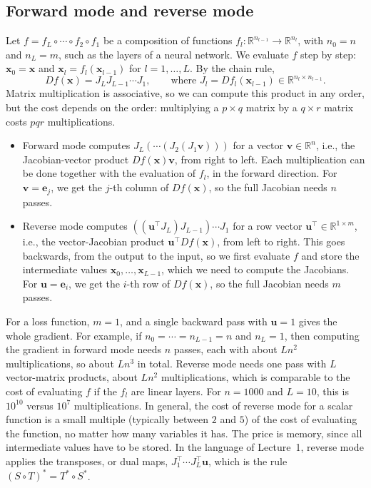 \subsection{Forward mode and reverse mode}

Let $f = f_L \circ \cdots \circ f_2 \circ f_1$ be a composition of functions $f_l: \mathbb{R}^{n_{l-1}} \to \mathbb{R}^{n_l}$, with $n_0 = n$ and $n_L = m$, such as the layers of a neural network. We evaluate $f$ step by step: $\mathbf{x}_0 = \mathbf{x}$ and $\mathbf{x}_l = f_l(\mathbf{x}_{l-1})$ for $l = 1, \ldots, L$. By the chain rule,
\[Df(\mathbf{x}) = J_L J_{L-1} \cdots J_1, \qquad \text{where } J_l = Df_l(\mathbf{x}_{l-1}) \in \mathbb{R}^{n_l \times n_{l-1}}.\]
Matrix multiplication is associative, so we can compute this product in any order, but the cost depends on the order: multiplying a $p \times q$ matrix by a $q \times r$ matrix costs $pqr$ multiplications.
\begin{itemize}
    \item Forward mode computes $J_L(\cdots(J_2(J_1\mathbf{v})))$ for a vector $\mathbf{v} \in \mathbb{R}^n$, i.e., the Jacobian-vector product $Df(\mathbf{x})\mathbf{v}$, from right to left. Each multiplication can be done together with the evaluation of $f_l$, in the forward direction. For $\mathbf{v} = \mathbf{e}_j$, we get the $j$-th column of $Df(\mathbf{x})$, so the full Jacobian needs $n$ passes.
    \item Reverse mode computes $((\mathbf{u}^\top J_L) J_{L-1}) \cdots J_1$ for a row vector $\mathbf{u}^\top \in \mathbb{R}^{1 \times m}$, i.e., the vector-Jacobian product $\mathbf{u}^\top Df(\mathbf{x})$, from left to right. This goes backwards, from the output to the input, so we first evaluate $f$ and store the intermediate values $\mathbf{x}_0, \ldots, \mathbf{x}_{L-1}$, which we need to compute the Jacobians. For $\mathbf{u} = \mathbf{e}_i$, we get the $i$-th row of $Df(\mathbf{x})$, so the full Jacobian needs $m$ passes.
\end{itemize}
For a loss function, $m = 1$, and a single backward pass with $\mathbf{u} = 1$ gives the whole gradient. For example, if $n_0 = \cdots = n_{L-1} = n$ and $n_L = 1$, then computing the gradient in forward mode needs $n$ passes, each with about $Ln^2$ multiplications, so about $Ln^3$ in total. Reverse mode needs one pass with $L$ vector-matrix products, about $Ln^2$ multiplications, which is comparable to the cost of evaluating $f$ if the $f_l$ are linear layers. For $n = 1000$ and $L = 10$, this is $10^{10}$ versus $10^7$ multiplications. In general, the cost of reverse mode for a scalar function is a small multiple (typically between $2$ and $5$) of the cost of evaluating the function, no matter how many variables it has. The price is memory, since all intermediate values have to be stored. In the language of Lecture~1, reverse mode applies the transposes, or dual maps, $J_1^\top \cdots J_L^\top \mathbf{u}$, which is the rule $(S \circ T)^* = T^* \circ S^*$.

